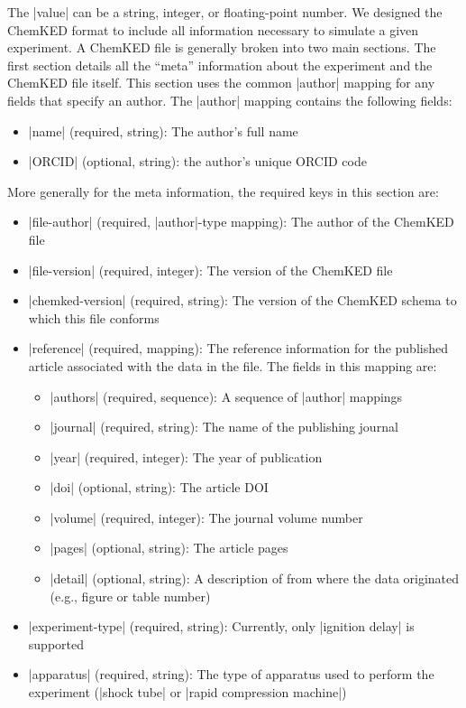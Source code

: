 \documentclass[12pt]{ijck}
\newcommand\ck{ChemKED}
\begin{document}
The \yabox|value| can be a string, integer, or floating-point number. We designed
the \ck{} format to include all information necessary to simulate a
given experiment. A \ck{} file is generally broken into two main sections.
The first section details all the ``meta'' information about the experiment
and the \ck{} file itself. This section uses the common \yabox|author| mapping
for any fields that specify an author. The \yabox|author| mapping
contains the following fields:
%
\begin{itemize}
    \item \yabox|name| (required, string): The author's full name
    \item \yabox|ORCID| (optional, string): the author's unique ORCID code
\end{itemize}
%
More generally for the meta information, the required keys in this section
are:
%
\begin{itemize}
    \item \yabox|file-author| (required, \yabox|author|-type mapping): The
    author of the \ck{} file
    \item \yabox|file-version| (required, integer): The version of the \ck{}
    file
    \item \yabox|chemked-version| (required, string): The version of the \ck{}
    schema to which this file conforms
    \item \yabox|reference| (required, mapping): The reference information for
    the published article associated with the data in the file. The fields in this
    mapping are:
    \begin{itemize}
        \item \yabox|authors| (required, sequence): A sequence of \yabox|author|
        mappings
        \item \yabox|journal| (required, string): The name of the publishing
        journal
        \item \yabox|year| (required, integer): The year of publication
        \item \yabox|doi| (optional, string): The article DOI
        \item \yabox|volume| (required, integer): The journal volume number
        \item \yabox|pages| (optional, string): The article pages
        \item \yabox|detail| (optional, string): A description of from where the
        data originated (e.g., figure or table number)
    \end{itemize}
    \item \yabox|experiment-type| (required, string): Currently, only
    \yabox|ignition delay| is supported
    \item \yabox|apparatus| (required, string): The type of apparatus used to
    perform the experiment (\yabox|shock tube| or \yabox|rapid compression machine|)
\end{itemize}
\end{document}
